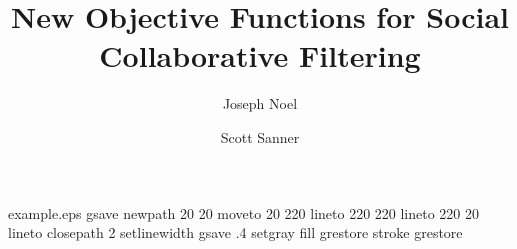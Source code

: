%
%
%
%
%
\begin{filecontents*}{example.eps}
gsave
newpath
  20 20 moveto
  20 220 lineto
  220 220 lineto
  220 20 lineto
closepath
2 setlinewidth
gsave
  .4 setgray fill
grestore
stroke
grestore
\end{filecontents*}
%
\RequirePackage{fix-cm}
%
\documentclass[smallextended]{svjour3}       %
%
\smartqed  %
%
\usepackage{graphicx}
%
%
%
%
%


\title{
New Objective Functions for Social Collaborative Filtering
}


\author{Joseph Noel         \and
        Scott Sanner %
}


